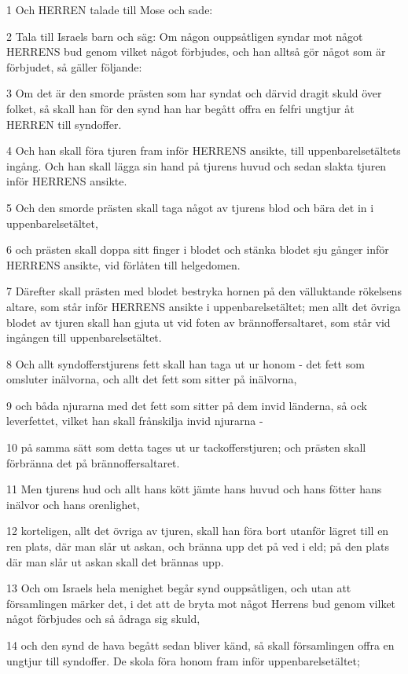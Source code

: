 \par 1 Och HERREN talade till Mose och sade:
\par 2 Tala till Israels barn och säg: Om någon ouppsåtligen syndar mot något HERRENS bud genom vilket något förbjudes, och han alltså gör något som är förbjudet, så gäller följande:
\par 3 Om det är den smorde prästen som har syndat och därvid dragit skuld över folket, så skall han för den synd han har begått offra en felfri ungtjur åt HERREN till syndoffer.
\par 4 Och han skall föra tjuren fram inför HERRENS ansikte, till uppenbarelsetältets ingång. Och han skall lägga sin hand på tjurens huvud och sedan slakta tjuren inför HERRENS ansikte.
\par 5 Och den smorde prästen skall taga något av tjurens blod och bära det in i uppenbarelsetältet,
\par 6 och prästen skall doppa sitt finger i blodet och stänka blodet sju gånger inför HERRENS ansikte, vid förlåten till helgedomen.
\par 7 Därefter skall prästen med blodet bestryka hornen på den välluktande rökelsens altare, som står inför HERRENS ansikte i uppenbarelsetältet; men allt det övriga blodet av tjuren skall han gjuta ut vid foten av brännoffersaltaret, som står vid ingången till uppenbarelsetältet.
\par 8 Och allt syndofferstjurens fett skall han taga ut ur honom - det fett som omsluter inälvorna, och allt det fett som sitter på inälvorna,
\par 9 och båda njurarna med det fett som sitter på dem invid länderna, så ock leverfettet, vilket han skall frånskilja invid njurarna -
\par 10 på samma sätt som detta tages ut ur tackofferstjuren; och prästen skall förbränna det på brännoffersaltaret.
\par 11 Men tjurens hud och allt hans kött jämte hans huvud och hans fötter hans inälvor och hans orenlighet,
\par 12 korteligen, allt det övriga av tjuren, skall han föra bort utanför lägret till en ren plats, där man slår ut askan, och bränna upp det på ved i eld; på den plats där man slår ut askan skall det brännas upp.
\par 13 Och om Israels hela menighet begår synd ouppsåtligen, och utan att församlingen märker det, i det att de bryta mot något Herrens bud genom vilket något förbjudes och så ådraga sig skuld,
\par 14 och den synd de hava begått sedan bliver känd, så skall församlingen offra en ungtjur till syndoffer. De skola föra honom fram inför uppenbarelsetältet;
